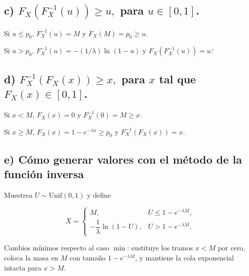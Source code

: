 \documentclass[10pt,a4paper]{article}
\begin{document}
    \begin{center}
    \end{center}
    { \hspace*{\fill} \\}
    
    \hypertarget{c-f_xf-1_xu-geq-u-para-u-in-0-1.}{%
\subsection{\texorpdfstring{c) \(F_X(F^{-1}_X(u)) \geq u,\) para
\(u \in [0, 1]\).}{c) F\_X(F\^{}\{-1\}\_X(u)) \textbackslash geq u, para u \textbackslash in {[}0, 1{]}.}}\label{c-f_xf-1_xu-geq-u-para-u-in-0-1.}}

    Si \(u\le p_0\), \(F_X^{-1}(u)=M\) y \(F_X(M)=p_0\ge u\).

Si \(u>p_0\), \(F_X^{-1}(u)=-(1/\lambda)\ln(1-u)\) y
\(F_X(F_X^{-1}(u))=u\).`

    \hypertarget{d-f-1_xf_xx-geq-x-para-x-tal-que-f_xx-in-0-1.}{%
\subsection{\texorpdfstring{d) \(F^{-1}_X(F_X(x)) \geq x,\) para \(x\)
tal que
\(F_X(x) \in [0, 1]\).}{d) F\^{}\{-1\}\_X(F\_X(x)) \textbackslash geq x, para x tal que F\_X(x) \textbackslash in {[}0, 1{]}.}}\label{d-f-1_xf_xx-geq-x-para-x-tal-que-f_xx-in-0-1.}}

    Si \(x<M\), \(F_X(x)=0\) y \(F_X^{-1}(0)=M\ge x\).

Si \(x\ge M\), \(F_X(x)=1-e^{-\lambda x}\ge p_0\) y
\(F_X^{-1}(F_X(x))=x\).

    \hypertarget{e-cuxf3mo-generar-valores-con-el-muxe9todo-de-la-funciuxf3n-inversa}{%
\subsection{e) Cómo generar valores con el método de la función
inversa}\label{e-cuxf3mo-generar-valores-con-el-muxe9todo-de-la-funciuxf3n-inversa}}

    Muestrea \(U\sim\mathrm{Unif}(0,1)\) y define

\[
X=\begin{cases}
M,& U\le 1-e^{-\lambda M},\\[6pt]
-\dfrac{1}{\lambda}\ln(1-U),& U>1-e^{-\lambda M}.
\end{cases}
\]

Cambios mínimos respecto al caso \(\min\): sustituye los tramos \(x<M\)
por cero, coloca la masa en \(M\) con tamaño \(1-e^{-\lambda M}\), y
mantiene la cola exponencial intacta para \(x>M\).
\end{document}

